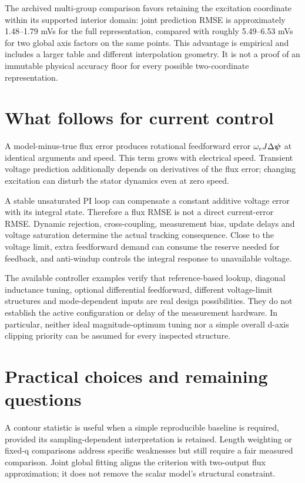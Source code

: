 The archived multi-group comparison favors retaining the excitation coordinate within its supported interior domain: joint prediction RMSE is approximately 1.48--1.79 mVs for the full representation, compared with roughly 5.49--6.53 mVs for two global axis factors on the same points. This advantage is empirical and includes a larger table and different interpolation geometry. It is not a proof of an immutable physical accuracy floor for every possible two-coordinate representation.

\section{What follows for current control}
A model-minus-true flux error produces rotational feedforward error $\omega_e J\Delta\bm\psi$ at identical arguments and speed. This term grows with electrical speed. Transient voltage prediction additionally depends on derivatives of the flux error; changing excitation can disturb the stator dynamics even at zero speed.

A stable unsaturated PI loop can compensate a constant additive voltage error with its integral state. Therefore a flux RMSE is not a direct current-error RMSE. Dynamic rejection, cross-coupling, measurement bias, update delays and voltage saturation determine the actual tracking consequence. Close to the voltage limit, extra feedforward demand can consume the reserve needed for feedback, and anti-windup controls the integral response to unavailable voltage.

The available controller examples verify that reference-based lookup, diagonal inductance tuning, optional differential feedforward, different voltage-limit structures and mode-dependent inputs are real design possibilities. They do not establish the active configuration or delay of the measurement hardware. In particular, neither ideal magnitude-optimum tuning nor a simple overall d-axis clipping priority can be assumed for every inspected structure.

\section{Practical choices and remaining questions}
A contour statistic is useful when a simple reproducible baseline is required, provided its sampling-dependent interpretation is retained. Length weighting or fixed-q comparisons address specific weaknesses but still require a fair measured comparison. Joint global fitting aligns the criterion with two-output flux approximation; it does not remove the scalar model's structural constraint.

